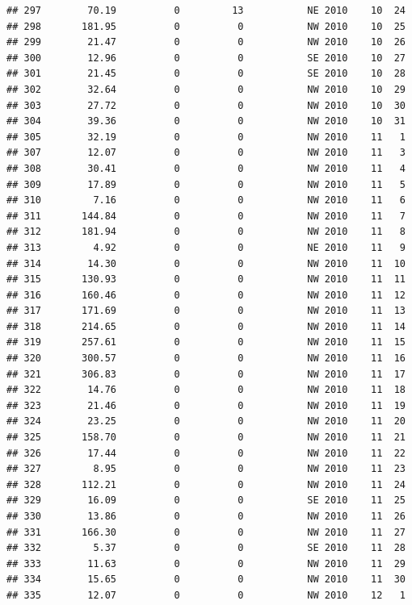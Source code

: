 \documentclass[
]{article}
\begin{document}
\begin{verbatim}
## 297        70.19          0         13           NE 2010    10  24
## 298       181.95          0          0           NW 2010    10  25
## 299        21.47          0          0           NW 2010    10  26
## 300        12.96          0          0           SE 2010    10  27
## 301        21.45          0          0           SE 2010    10  28
## 302        32.64          0          0           NW 2010    10  29
## 303        27.72          0          0           NW 2010    10  30
## 304        39.36          0          0           NW 2010    10  31
## 305        32.19          0          0           NW 2010    11   1
## 307        12.07          0          0           NW 2010    11   3
## 308        30.41          0          0           NW 2010    11   4
## 309        17.89          0          0           NW 2010    11   5
## 310         7.16          0          0           NW 2010    11   6
## 311       144.84          0          0           NW 2010    11   7
## 312       181.94          0          0           NW 2010    11   8
## 313         4.92          0          0           NE 2010    11   9
## 314        14.30          0          0           NW 2010    11  10
## 315       130.93          0          0           NW 2010    11  11
## 316       160.46          0          0           NW 2010    11  12
## 317       171.69          0          0           NW 2010    11  13
## 318       214.65          0          0           NW 2010    11  14
## 319       257.61          0          0           NW 2010    11  15
## 320       300.57          0          0           NW 2010    11  16
## 321       306.83          0          0           NW 2010    11  17
## 322        14.76          0          0           NW 2010    11  18
## 323        21.46          0          0           NW 2010    11  19
## 324        23.25          0          0           NW 2010    11  20
## 325       158.70          0          0           NW 2010    11  21
## 326        17.44          0          0           NW 2010    11  22
## 327         8.95          0          0           NW 2010    11  23
## 328       112.21          0          0           NW 2010    11  24
## 329        16.09          0          0           SE 2010    11  25
## 330        13.86          0          0           NW 2010    11  26
## 331       166.30          0          0           NW 2010    11  27
## 332         5.37          0          0           SE 2010    11  28
## 333        11.63          0          0           NW 2010    11  29
## 334        15.65          0          0           NW 2010    11  30
## 335        12.07          0          0           NW 2010    12   1

\end{verbatim}
\end{document}
